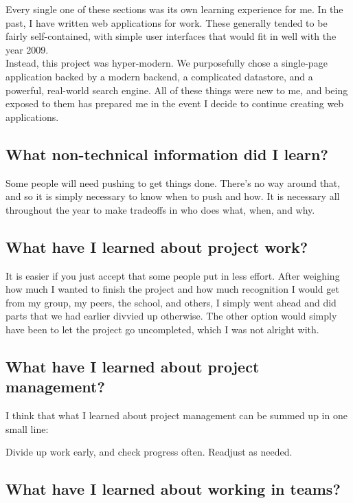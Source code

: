 \documentclass[onecolumn, draftclsnofoot,10pt, compsoc]{IEEEtran}
\begin{document}
Every single one of these sections was its own learning experience for me. In the
past, I have written web applications for work. These generally tended to be fairly
self-contained, with simple user interfaces that would fit in well with the year 2009. \\

Instead, this project was hyper-modern. We purposefully chose a single-page application
backed by a modern backend, a complicated datastore, and a powerful, real-world
search engine. All of these things were new to me, and being exposed to them has
prepared me in the event I decide to continue creating web applications.

\subsection{What non-technical information did I learn?}

Some people will need pushing to get things done. There's no way around that, and
so it is simply necessary to know when to push and how. It is necessary all throughout
the year to make tradeoffs in who does what, when, and why.

\subsection{What have I learned about project work?}

It is easier if you just accept that some people put in less effort. After weighing
how much I wanted to finish the project and how much recognition I would get from
my group, my peers, the school, and others, I simply went ahead and did parts that
we had earlier divvied up otherwise. The other option would simply have been to
let the project go uncompleted, which I was not alright with.

\subsection{What have I learned about project management?}

I think that what I learned about project management can be summed up in one small line:

\begin{displayquote}
Divide up work early, and check progress often. Readjust as needed.
\end{displayquote}

\subsection{What have I learned about working in teams?}
\end{document}
